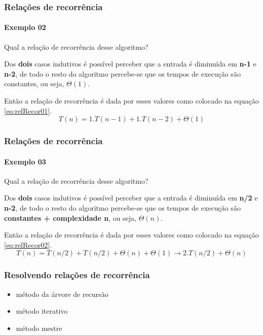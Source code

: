 \begin{frame}
	\frametitle{Relações de recorrência}
	\framesubtitle{Exemplo 02}
	\par Qual a relação de recorrência desse algoritmo?\\
	
	\par Dos \textbf{dois} casos indutivos é possível perceber que a entrada é diminuída em \textbf{n-1} e \textbf{n-2}, de todo o resto do algoritmo percebe-se que os tempos de execução são constantes, ou seja, $\Theta(1)$.
	\par Então a relação de recorrência é dada por esses valores como colocado na equação \ref{eq:relRecor01}. 
	\begin{equation}
		\label{eq:relRecor01}
		T(n) = 1.T(n-1) + 1.T(n-2) + \Theta(1)
	\end{equation}
\end{frame}


\begin{frame}
	\frametitle{Relações de recorrência}
	\framesubtitle{Exemplo 03}
	\par Qual a relação de recorrência desse algoritmo?\\
	
	\par Dos \textbf{dois} casos indutivos é possível perceber que a entrada é diminuída em \textbf{n/2} e \textbf{n-2}, de todo o resto do algoritmo percebe-se que os tempos de execução são \textbf{constantes + complexidade n}, ou seja, $\Theta(n)$.
	\par Então a relação de recorrência é dada por esses valores como colocado na equação \ref{eq:relRecor02}. 
	\begin{equation}
		\label{eq:relRecor02}
		T(n) = T(n/2) + T(n/2) + \Theta(n) + \Theta(1) \rightarrow 2.T(n/2) + \Theta(n)
	\end{equation}
\end{frame}

\begin{frame}
	\frametitle{Resolvendo relações de recorrência}
	\begin{itemize}
		\item método da árvore de recursão
		\item método iterativo
		\item método mestre
	\end{itemize}
\end{frame}

